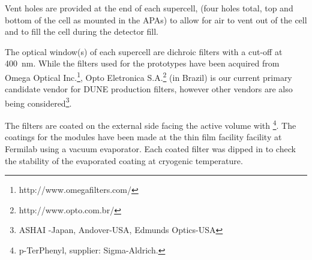 
Vent holes are provided at the end of each supercell, (four holes total, top and bottom of the cell as mounted in the APAs) to allow for air to vent out of the cell and  to fill the cell during the detector fill.




The optical window(s) of each supercell are dichroic filters with a cut-off at \SI{400}{nm}. While the filters used for the  prototypes have been acquired from Omega Optical Inc.\footnote{http://www.omegafilters.com/}, Opto Eletronica S.A.\footnote{http://www.opto.com.br/} (in Brazil) is our current primary candidate vendor for DUNE production filters, however other vendors are also being considered\footnote{ASHAI -Japan, Andover-USA, Edmunds Optics-USA}.
   
The filters are coated on the external side facing the \lar active volume with \footnote{p-TerPhenyl, supplier: Sigma-Aldrich\textregistered.}.  The coatings for the  modules have been made at the thin film facility facility at Fermilab using a vacuum evaporator. Each coated filter was dipped in  to check the stability of the evaporated coating at cryogenic temperature. 

